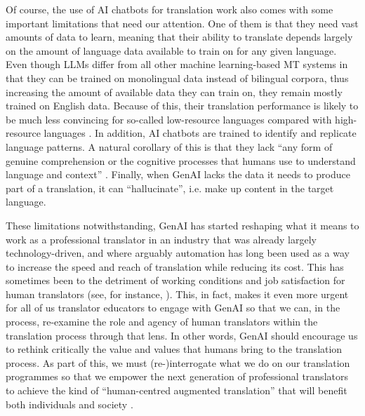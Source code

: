 \documentclass[output=paper]{langscibook}
\begin{document}
Of course, the use of AI chatbots for translation work also comes with some important limitations that need our attention. One of them is that they need vast amounts of data to learn, meaning that their ability to translate depends largely on the amount of language data available to train on for any given language. Even though LLMs differ from all other machine learning-based MT systems in that they can be trained on monolingual data instead of bilingual corpora, thus increasing the amount of available data they can train on, they remain mostly trained on English data. Because of this, their translation performance is likely to be much less convincing for so-called low-resource languages compared with high-resource languages . In addition, AI chatbots are trained to identify and replicate language patterns. A natural corollary of this is that they lack “any form of genuine comprehension or the cognitive processes that humans use to understand language and context” \citep[189]{moorkens_automating_2025}. Finally, when GenAI lacks the data it needs to produce part of a translation, it can “hallucinate”, i.e. make up content in the target language. 

These limitations notwithstanding, GenAI has started reshaping what it means to work as a professional translator in an industry that was already largely technology-driven, and where arguably automation has long been used as a way to increase the speed and reach of translation while reducing its cost. This has sometimes been to the detriment of working conditions and job satisfaction for human translators (see, for instance, \cite{lambertwalker2024}). This, in fact, makes it even more urgent for all of us translator educators to engage with GenAI so that we can, in the process, re-examine the role and agency of human translators within the translation process through that lens. In other words, GenAI should encourage us to rethink critically the value and values that humans bring to the translation process. As part of this, we must (re-)interrogate what we do on our translation programmes so that we empower the next generation of professional translators to achieve the kind of “human-centred augmented translation” that will benefit both individuals and society \citep[391]{obrien_human-centered_2024}.
\end{document}
